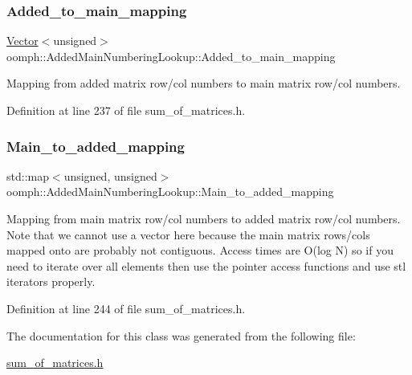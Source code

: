 \subsubsection{\texorpdfstring{Added\+\_\+to\+\_\+main\+\_\+mapping}{Added\_to\_main\_mapping}}
{\footnotesize\ttfamily \hyperlink{classoomph_1_1Vector}{Vector}$<$unsigned$>$ oomph\+::\+Added\+Main\+Numbering\+Lookup\+::\+Added\+\_\+to\+\_\+main\+\_\+mapping\hspace{0.3cm}{\ttfamily [private]}}



Mapping from added matrix row/col numbers to main matrix row/col numbers. 



Definition at line 237 of file sum\+\_\+of\+\_\+matrices.\+h.

\mbox{\label{classoomph_1_1AddedMainNumberingLookup_ac37dc1a1c43aec35b3cdf57a6aaf838c}} 
\subsubsection{\texorpdfstring{Main\+\_\+to\+\_\+added\+\_\+mapping}{Main\_to\_added\_mapping}}
{\footnotesize\ttfamily std\+::map$<$unsigned, unsigned$>$ oomph\+::\+Added\+Main\+Numbering\+Lookup\+::\+Main\+\_\+to\+\_\+added\+\_\+mapping\hspace{0.3cm}{\ttfamily [private]}}

Mapping from main matrix row/col numbers to added matrix row/col numbers. Note that we cannot use a vector here because the main matrix rows/cols mapped onto are probably not contiguous. Access times are O(log N) so if you need to iterate over all elements then use the pointer access functions and use stl iterators properly. 

Definition at line 244 of file sum\+\_\+of\+\_\+matrices.\+h.



The documentation for this class was generated from the following file\+:\begin{DoxyCompactItemize}
\item 
\hyperlink{sum__of__matrices_8h}{sum\+\_\+of\+\_\+matrices.\+h}\end{DoxyCompactItemize}
